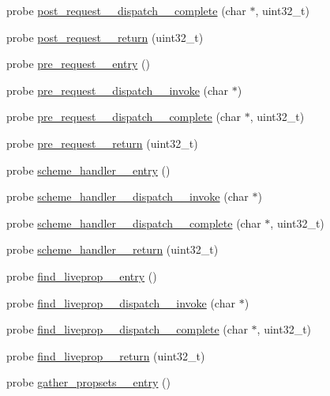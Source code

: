 \begin{DoxyCompactItemize}
\item 
probe \hyperlink{apache__probes_8d_ae2f3173292f01734c5598dd484adb285}{post\+\_\+request\+\_\+\+\_\+dispatch\+\_\+\+\_\+complete} (char $\ast$, uint32\+\_\+t)
\item 
probe \hyperlink{apache__probes_8d_a5953f24d049ac32d6fa895b365fd787c}{post\+\_\+request\+\_\+\+\_\+return} (uint32\+\_\+t)
\item 
probe \hyperlink{apache__probes_8d_af998151c20ad7884d9672f1080fed619}{pre\+\_\+request\+\_\+\+\_\+entry} ()
\item 
probe \hyperlink{apache__probes_8d_a54a764e054fbe1adb7af12cb61f39d2b}{pre\+\_\+request\+\_\+\+\_\+dispatch\+\_\+\+\_\+invoke} (char $\ast$)
\item 
probe \hyperlink{apache__probes_8d_a0242c676a648cbc55723baae09a8de88}{pre\+\_\+request\+\_\+\+\_\+dispatch\+\_\+\+\_\+complete} (char $\ast$, uint32\+\_\+t)
\item 
probe \hyperlink{apache__probes_8d_afee965ccb25fd91019a21c98afc98b99}{pre\+\_\+request\+\_\+\+\_\+return} (uint32\+\_\+t)
\item 
probe \hyperlink{apache__probes_8d_addb29aec77ac985097e052a86964cfe1}{scheme\+\_\+handler\+\_\+\+\_\+entry} ()
\item 
probe \hyperlink{apache__probes_8d_ae6c88e3a4f899c2660112cac1770441c}{scheme\+\_\+handler\+\_\+\+\_\+dispatch\+\_\+\+\_\+invoke} (char $\ast$)
\item 
probe \hyperlink{apache__probes_8d_a4f035d8328f184946581f14a3ee84d96}{scheme\+\_\+handler\+\_\+\+\_\+dispatch\+\_\+\+\_\+complete} (char $\ast$, uint32\+\_\+t)
\item 
probe \hyperlink{apache__probes_8d_ae869cde52d200a7c4e4e939bc829ea60}{scheme\+\_\+handler\+\_\+\+\_\+return} (uint32\+\_\+t)
\item 
probe \hyperlink{apache__probes_8d_a83e419b0453182611cbb471b2b55e463}{find\+\_\+liveprop\+\_\+\+\_\+entry} ()
\item 
probe \hyperlink{apache__probes_8d_a52a25701c5aaa45f7f339b051d54ad23}{find\+\_\+liveprop\+\_\+\+\_\+dispatch\+\_\+\+\_\+invoke} (char $\ast$)
\item 
probe \hyperlink{apache__probes_8d_a49c2aab2edeabaf329a6a87f0b2654df}{find\+\_\+liveprop\+\_\+\+\_\+dispatch\+\_\+\+\_\+complete} (char $\ast$, uint32\+\_\+t)
\item 
probe \hyperlink{apache__probes_8d_a6c755e6abe47c84cc606755d03b98305}{find\+\_\+liveprop\+\_\+\+\_\+return} (uint32\+\_\+t)
\item 
probe \hyperlink{apache__probes_8d_a4c3838e8611f5b37b2f27c79082c7e0b}{gather\+\_\+propsets\+\_\+\+\_\+entry} ()

\end{DoxyCompactItemize}
